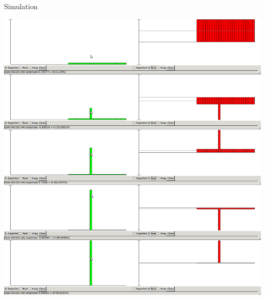 \documentclass{beamer}
\begin{document}
\begin{frame}{Simulation}
\begin{center}
\includegraphics[scale=0.11]{simulate}
\end{center}
\end{frame}
\end{document}
